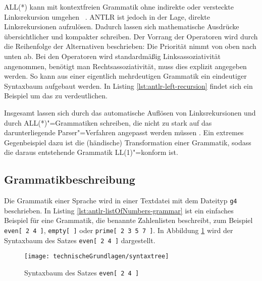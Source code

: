 ALL(*) kann mit kontextfreien Grammatik ohne indirekte oder versteckte Linksrekursion umgehen \cite{ANTLR4Reference} \cite{ANTLRALLStar}. ANTLR ist jedoch in der Lage, direkte Linksrekursionen aufzulösen. Dadurch lassen sich mathematische Ausdrücke übersichtlicher und kompakter schreiben. Der Vorrang der Operatoren wird durch die Reihenfolge der Alternativen beschrieben: Die Priorität nimmt von oben nach unten ab. Bei den Operatoren wird standardmäßig Linksassoziativität angenommen, benötigt man Rechtsassoziativität, muss dies explizit angegeben werden. So kann aus einer eigentlich mehrdeutigen Grammatik ein eindeutiger Syntaxbaum aufgebaut werden. In Listing \ref{lst:antlr-left-recursion} findet sich ein Beispiel um das zu verdeutlichen.

\pagebreak


Insgesamt lassen sich durch das automatische Auflösen von Linksrekursionen und durch ALL(*)"=Grammatiken schreiben, die nicht zu stark auf das darunterliegende Parser"=Verfahren angepasst werden müssen \cite{ANTLR4Reference}. Ein extremes Gegenbeispiel dazu ist die (händische) Transformation einer Grammatik, sodass die daraus entstehende Grammatik LL(1)"=konform ist.

\subsection{Grammatikbeschreibung}

Die Grammatik einer Sprache wird in einer Textdatei mit dem Dateityp \lstinline{g4} beschrieben. In Listing \ref{lst:antlr-listOfNumbers-grammar} ist ein einfaches Beispiel für eine Grammatik, die benannte Zahlenlisten beschreibt, zum Beispiel \lstinline{even[ 2 4 ]}, \lstinline{empty[ ]} oder \lstinline{prime[ 2 3 5 7 ]}. In Abbildung \ref{fig:syntaxtree} wird der Syntaxbaum des Satzes \lstinline{even[ 2 4 ]} dargestellt.



\begin{figure}[b]
    \centering
    \texttt{[image: technischeGrundlagen/syntaxtree]}
    \caption{Syntaxbaum des Satzes \lstinline{even[ 2 4 ]}}
    \label{fig:syntaxtree}
\end{figure}

